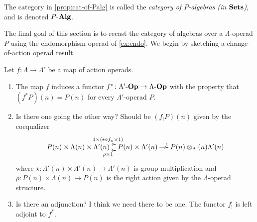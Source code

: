 \begin{nota}\label{nota:cat-of-palg}
The category in \cref{prop:cat-of-Palg} is called the \emph{category of $P$-algebras (in $\mathbf{Sets}$)}, and is denoted $P\mbox{-}\mathbf{Alg}$.
\end{nota}

The final goal of this section is to recast the category of algebras over a $\Lambda$-operad $P$ using the endomorphism operad of \cref{ex:endo}.
We begin by sketching a change-of-action operad result.

\begin{prop}\label{prop:pbaop}
Let $f \colon \Lambda \rightarrow \Lambda'$ be a map of action operads. 
\begin{enumerate}
\item The map $f$ induces a functor $f^{*} \colon \Lambda'\mbox{-}\mathbf{Op} \rightarrow \Lambda\mbox{-}\mathbf{Op}$ with the property that $(f^{*}P)(n) = P(n)$ for every $\Lambda'$-operad $P$.
\item {}Is there one going the other way? Should be $(f_{!}P)(n)$ given by the coequalizer
    \[
        \xy
            (0,0)*+{P(n) \times \Lambda(n) \times \Lambda'(n)}="00";
            (30,0)*+{P(n) \times \Lambda'(n)}="10";
            (60,0)*+{\coeqb{P(n)}{\Lambda'(n)}{\Lambda(n)}}="20";
            {\ar@<1ex>^{1 \times (\star \circ f_n \times 1)} "00" ; "10"};
            {\ar@<-1ex>_{\rho \times 1} "00" ; "10"};
            {\ar^{\varepsilon} "10" ; "20"};
        \endxy
    \]
where $\star \colon \Lambda'(n) \times \Lambda'(n) \to \Lambda'(n)$ is group multiplication and $\rho \colon P(n) \times \Lambda(n) \to P(n)$ is the right action given by the $\Lambda$-operad structure. 
\item Is there an adjunction? I think we need there to be one. The functor $f_{!}$ is left adjoint to $f^*$.
\end{enumerate}
\end{prop}

